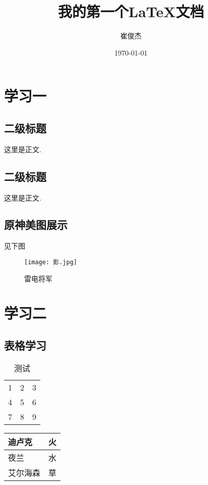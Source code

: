 \documentclass[12pt, a4paper, oneside]{ctexart}
\title{我的第一个\LaTeX 文档}
\author{崔俊杰}
\date{\today}
\begin{document}
\maketitle

\tableofcontents

\section{学习一}

\subsection{二级标题}

这里是正文. 

\subsection{二级标题}

这里是正文. 

\subsection{原神美图展示}
见下图

\begin{figure}[htbp]
    \centering
    \texttt{[image: 影.jpg]}
    \caption{雷电将军}
\end{figure}

\section{学习二}

\subsection{表格学习}

\begin{table}[htbp]
    \centering
    \caption{测试}
    \begin{tabular}{ccc}
        1 & 2 & 3 \\
        4 & 5 & 6 \\
        7 & 8 & 9 \\
    \end{tabular}
\end{table}

\begin{tabular}{|l|l|}
    \hline
    迪卢克 & 火 \\
    \hline
    夜兰 & 水 \\ 
    \hline
    艾尔海森 & 草 \\ 
    \hline
\end{tabular}
\end{document}
